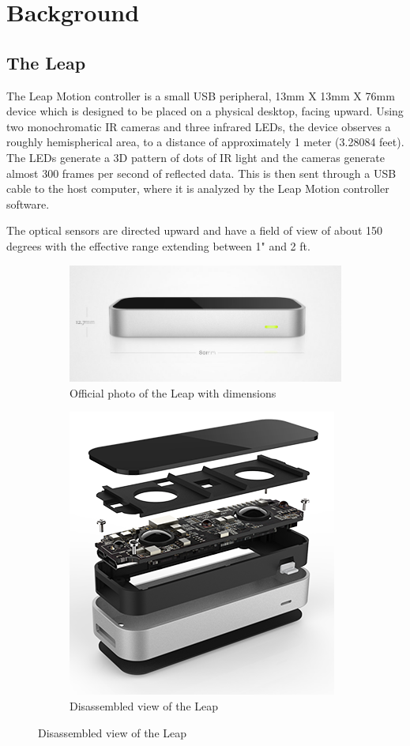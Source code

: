 \documentclass[a4paper]{article}
\begin{document}
\section{Background}
\subsection{The Leap}
The Leap Motion controller is a small USB peripheral, 13mm X 13mm X 76mm device which is designed to be placed on a physical desktop, facing upward. Using two monochromatic IR cameras and three infrared LEDs, the device observes a roughly hemispherical area, to a distance of approximately 1 meter (3.28084 feet). The LEDs generate a 3D pattern of dots of IR light and the cameras generate almost 300 frames per second of reflected data. This is then sent through a USB cable to the host computer, where it is analyzed by the Leap Motion controller software.\cite{Leap Teardown}\cite{Leap Specs}

The optical sensors are directed upward and have a field of view of about 150 degrees with the effective range extending between 1" and 2 ft. \cite{Leap Overview} \\
\newline
\begin{figure}[htb]
\centering
\begin{subfigure}{.5\textwidth}
  \centering
  \includegraphics[width=.65\linewidth]{leap_01.jpg}
  \caption{Official photo of the Leap with dimensions \cite{Leap Site}} 
 
\end{subfigure}%
\begin{subfigure}{.5\textwidth}
  \centering
  \includegraphics[width=.65\linewidth]{Leap_03.png}
  \caption{Disassembled view of the Leap \cite{LeapLab}}
 
\end{subfigure}
\end{figure}
\end{document}
